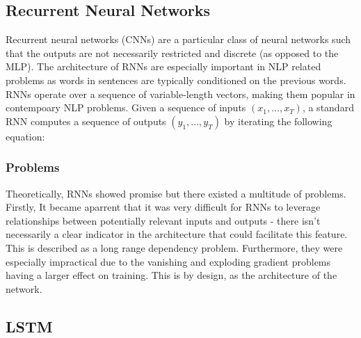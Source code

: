 \documentclass[12pt,twoside]{report}
\begin{document}
\subsection{Recurrent Neural Networks}


Recurrent neural networks (CNNs) are a particular class of neural networks such that the outputs are not necessarily restricted and discrete (as opposed to the MLP). 
The architecture of RNNs are especially important in NLP related problems as words in sentences are typically conditioned on the previous words. RNNs  operate over a sequence of variable-length vectors, making them popular in contempoary NLP problems. Given a sequence of inputs $(x_1, ..., x_T)$, a standard RNN computes a sequence of outputs $(y_1, ..., y_T)$ by iterating the following equation:


\subsubsection{Problems}

Theoretically, RNNs showed promise but there existed a multitude of problems. Firstly, It became aparrent that it was very difficult for RNNs to leverage relationships between potentially relevant inputs and outputs - there isn't necessarily a clear indicator in the architecture that could facilitate this feature. This is described as a long range dependency problem. Furthermore, they were especially impractical due to the vanishing and exploding gradient problems having a larger effect on training. This is by design, as the architecture of the network.

\subsection{LSTM}
\end{document}
